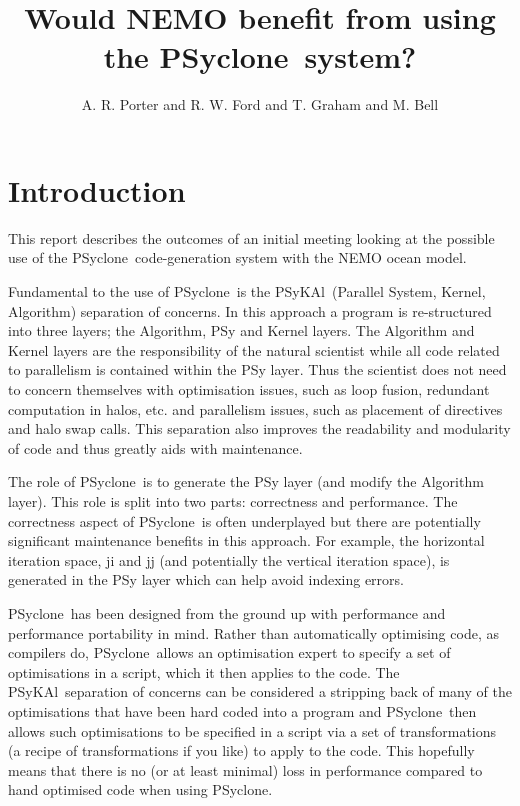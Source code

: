 \documentclass{article}
\newcommand{\psykal}{{PS}y{KA}l}
\newcommand{\psyclone}{{PS}yclone}
\begin{document}
\title{Would NEMO benefit from using the \psyclone\ system?}

\author{A. R. Porter and R. W. Ford and T. Graham and M. Bell}

\maketitle

\section{Introduction}

This report describes the outcomes of an initial meeting looking at
the possible use of the \psyclone\ code-generation system with the NEMO
ocean model.

Fundamental to the use of \psyclone\ is the \psykal\ (Parallel System,
Kernel, Algorithm) separation of concerns. In this approach a program
is re-structured into three layers; the Algorithm, PSy and Kernel
layers.  The Algorithm and Kernel layers are the responsibility of the
natural scientist while all code related to parallelism is contained
within the PSy layer. Thus the scientist does not need to concern
themselves with optimisation issues, such as loop fusion, redundant
computation in halos, etc. and parallelism issues, such as placement
of directives and halo swap calls. This separation also improves the
readability and modularity of code and thus greatly aids with
maintenance.

The role of \psyclone\ is to generate the PSy layer (and modify the
Algorithm layer). This role is split into two parts: correctness and
performance. The correctness aspect of \psyclone\ is often underplayed
but there are potentially significant maintenance benefits in this
approach. For example, the horizontal iteration space, ji and jj (and
potentially the vertical iteration space), is generated in the PSy
layer which can help avoid indexing errors.

\psyclone\ has been designed from the ground up with performance and
performance portability in mind. Rather than automatically optimising
code, as compilers do, \psyclone\ allows an optimisation expert to
specify a set of optimisations in a script, which it then applies to
the code. The \psykal\ separation of concerns can be considered a
stripping back of many of the optimisations that have been hard coded
into a program and \psyclone\ then allows such optimisations to be
specified in a script via a set of transformations (a recipe of
transformations if you like) to apply to the code. This hopefully
means that there is no (or at least minimal) loss in performance
compared to hand optimised code when using \psyclone.
\end{document}
